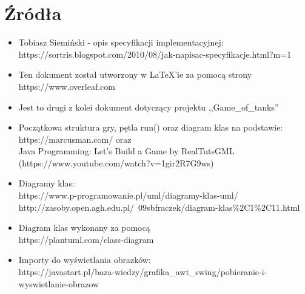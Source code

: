 \documentclass{article}
\begin{document}
\section{Źródła}
\begin{itemize}
    \item Tobiasz Siemiński - opis specyfikacji implementacyjnej: \\ https://sortris.blogspot.com/2010/08/jak-napisac-specyfikacje.html?m=1
    
    \item Ten dokument został utworzony w LaTeX'ie za pomocą strony \\ https://www.overleaf.com
    
    \item Jest to drugi z kolei dokument dotyczący projektu ,,Game\_of\_tanks''

    \item Początkowa struktura gry, pętla run() oraz diagram klas na podstawie: \\
    https://marcusman.com/ oraz \\
    Java Programming: Let's Build a Game by RealTutsGML \\ 
    (https://www.youtube.com/watch?v=1gir2R7G9ws)
    
    \item Diagramy klas: \\
    https://www.p-programowanie.pl/uml/diagramy-klas-uml/ \\
    http://zasoby.open.agh.edu.pl/~09sbfraczek/diagram-klas\%2C1\%2C11.html
    
    \item Diagram klas wykonany za pomocą \\ https://plantuml.com/class-diagram
    
    \item Importy do wyświetlania obrazków: \\ https://javastart.pl/baza-wiedzy/grafika\_awt\_swing/pobieranie-i-wyswietlanie-obrazow
    
\end{itemize}
\end{document}
